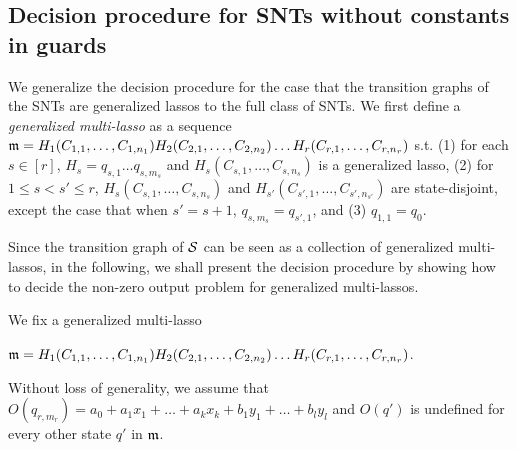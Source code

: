 \vspace{-2mm}
\subsection{Decision procedure for SNTs without constants in guards}\label{sec-gflat}
\vspace{-1mm}

We generalize the decision procedure for the case that the transition graphs of the SNTs are generalized lassos to the full class of SNTs.
We first define a \emph{generalized multi-lasso} as a sequence $\mathfrak{m}= H_1 (C_{1,1},\dots,C_{1,n_1}) H_2 (C_{2,1},\dots,C_{2,n_2}) \dots H_r (C_{r,1},\dots, C_{r, n_r})$ s.t. (1) for each $s\in[r]$, $H_s = q_{s,1} \dots q_{s, m_s}$ and $H_s (C_{s,1},\dots,C_{s, n_s})$ is a generalized lasso, (2) for $1 \leq s< s' \leq r$, $H_s (C_{s,1},\dots,C_{s, n_s})$ and $H_{s'} (C_{s', 1},\dots,C_{s', n_{s'}})$ are state-disjoint, except the case that when $s'=s+1$, $q_{s, m_s}=q_{s',1}$, and (3) $q_{1,1}=q_0$.

Since the transition graph of ${\mathcal{S} }$ can be seen as a collection of generalized multi-lassos, in the following, we shall present the decision procedure by showing how to decide the non-zero output problem for generalized multi-lassos. 

We fix a generalized multi-lasso

\smallskip
\hspace{8mm} $\mathfrak{m}= H_1 (C_{1,1},\dots,C_{1,n_1}) H_2 (C_{2,1},\dots,C_{2,n_2}) \dots H_r (C_{r,1},\dots, C_{r, n_r})$.

\smallskip
\noindent Without loss of generality, we assume that $O(q_{r,m_r})=a_0+a_1 x_1 + \dots + a_k x_k + b_1 y_1  + \dots + b_l y_l$ and $O(q')$ is undefined for every other state $q'$ in $\mathfrak{m}$.\smallskip\\
\smallskip

